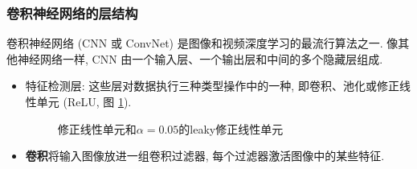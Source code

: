 \subsubsection{卷积神经网络的层结构}
卷积神经网络 (CNN 或 ConvNet) 是图像和视频深度学习的最流行算法之一.
像其他神经网络一样, CNN 由一个输入层、一个输出层和中间的多个隐藏层组成.
\begin{itemize}
    \item 特征检测层: 这些层对数据执行三种类型操作中的一种, 即卷积、池化或修正线性单元 (ReLU, 图 \ref{ReLU20200203001}).
    \begin{figure}[H]
    \begin{center}
    \end{center}
    \vspace{-0.2cm}
    \caption{修正线性单元和$\alpha=0.05$的leaky修正线性单元}
    \label{ReLU20200203001}
    \end{figure}
    \item \textbf{卷积}将输入图像放进一组卷积过滤器, 每个过滤器激活图像中的某些特征.
\end{itemize}


